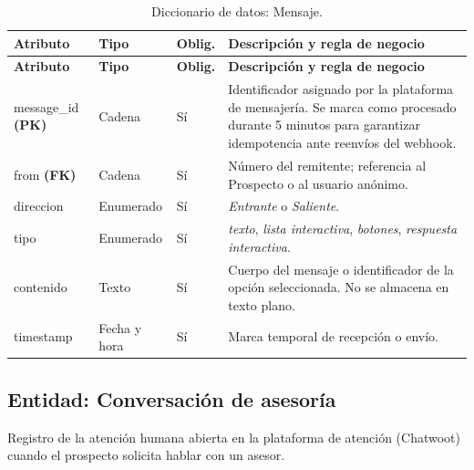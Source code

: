 \documentclass[12pt,a4paper]{report}
\newcommand{\tablacompacta}{\setstretch{1.1}\small}
\newcommand{\cabecera}[1]{\rowcolor{filacabecera}#1}
\begin{document}
{\tablacompacta
\begin{longtable}{p{3.1cm}p{2.2cm}p{1.3cm}p{6.0cm}}
\caption{Diccionario de datos: Mensaje.}\label{tab:dd-mensaje}\\
\toprule
\cabecera{\textbf{Atributo}} & \textbf{Tipo} & \textbf{Oblig.} & \textbf{Descripción y regla de negocio} \\
\midrule
\endfirsthead
\toprule
\textbf{Atributo} & \textbf{Tipo} & \textbf{Oblig.} & \textbf{Descripción y regla de negocio} \\
\midrule
\endhead
\bottomrule
\endfoot
message\_id \textbf{(PK)} & Cadena & Sí & Identificador asignado por la plataforma de mensajería. Se marca como procesado durante 5 minutos para garantizar idempotencia ante reenvíos del webhook. \\
from \textbf{(FK)} & Cadena & Sí & Número del remitente; referencia al Prospecto o al usuario anónimo. \\
direccion & Enumerado & Sí & \textit{Entrante} o \textit{Saliente}. \\
tipo & Enumerado & Sí & \textit{texto}, \textit{lista interactiva}, \textit{botones}, \textit{respuesta interactiva}. \\
contenido & Texto & Sí & Cuerpo del mensaje o identificador de la opción seleccionada. No se almacena en texto plano. \\
timestamp & Fecha y hora & Sí & Marca temporal de recepción o envío. \\
\end{longtable}}

\subsection{Entidad: Conversación de asesoría}

Registro de la atención humana abierta en la plataforma de atención (Chatwoot) cuando el prospecto
solicita hablar con un asesor.
\end{document}
